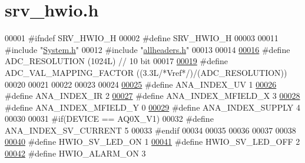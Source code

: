 \hypertarget{a00058_source}{\section{srv\+\_\+hwio.\+h}
\label{a00058_source}
}

\begin{DoxyCode}
00001 \textcolor{preprocessor}{#ifndef SRV\_HWIO\_H}
00002 \textcolor{preprocessor}{#define SRV\_HWIO\_H}
00003 
00011 \textcolor{preprocessor}{#include "\hyperlink{a00072}{System.h}"}
00012 \textcolor{preprocessor}{#include "\hyperlink{a00040}{allheaders.h}"}
00013 
00014 
\hypertarget{a00058_source_l00016}{}\hyperlink{a00058_a00978ca9e8220475258dcbbbb7d29129}{00016} \textcolor{preprocessor}{#define ADC\_RESOLUTION                                       (1024L) // 10 bit}
00017 
\hypertarget{a00058_source_l00019}{}\hyperlink{a00058_ada92d3eeeec0cbeee41e76a52d145792}{00019} \textcolor{preprocessor}{#define ADC\_VAL\_MAPPING\_FACTOR                               ((3.3L}\textcolor{comment}{/*Vref*/}\textcolor{preprocessor}{)/(ADC\_RESOLUTION))}
00020 
00021 
00022 
00023 
00024 
\hypertarget{a00058_source_l00025}{}\hyperlink{a00058_af523b82e94e382153f1313307c5bd879}{00025} \textcolor{preprocessor}{#define ANA\_INDEX\_UV                   1}
\hypertarget{a00058_source_l00026}{}\hyperlink{a00058_a1fae4d2e8dd35f504ec4170044da7e73}{00026} \textcolor{preprocessor}{#define ANA\_INDEX\_IR                   2}
\hypertarget{a00058_source_l00027}{}\hyperlink{a00058_aa797210faae0317a1b0ddace04d1257e}{00027} \textcolor{preprocessor}{#define ANA\_INDEX\_MFIELD\_X             3}
\hypertarget{a00058_source_l00028}{}\hyperlink{a00058_aa2f14d4d069c5888b1d230be59751a09}{00028} \textcolor{preprocessor}{#define ANA\_INDEX\_MFIELD\_Y             0}
\hypertarget{a00058_source_l00029}{}\hyperlink{a00058_a43ed3aca409e3fc633f213bc648ff1cc}{00029} \textcolor{preprocessor}{#define ANA\_INDEX\_SUPPLY               4}
00030 
00031 \textcolor{preprocessor}{#if(DEVICE == AQ0X\_V1)}
00032 \textcolor{preprocessor}{#define ANA\_INDEX\_SV\_CURRENT           5}
00033 \textcolor{preprocessor}{#endif}
00034 
00035 
00036 
00037 
00038 
\hypertarget{a00058_source_l00040}{}\hyperlink{a00058_aae186cdf37c0783bf64b0aed3f1e6eda}{00040} \textcolor{preprocessor}{#define         HWIO\_SV\_LED\_ON                              1}
\hypertarget{a00058_source_l00041}{}\hyperlink{a00058_a8fe69ad7e533d2e88cec53c22a56f8fb}{00041} \textcolor{preprocessor}{#define         HWIO\_SV\_LED\_OFF                             2}
\hypertarget{a00058_source_l00042}{}\hyperlink{a00058_abcbef2f48463bed54ae1c045303dbab8}{00042} \textcolor{preprocessor}{#define         HWIO\_ALARM\_ON                               3}

\end{DoxyCode}
